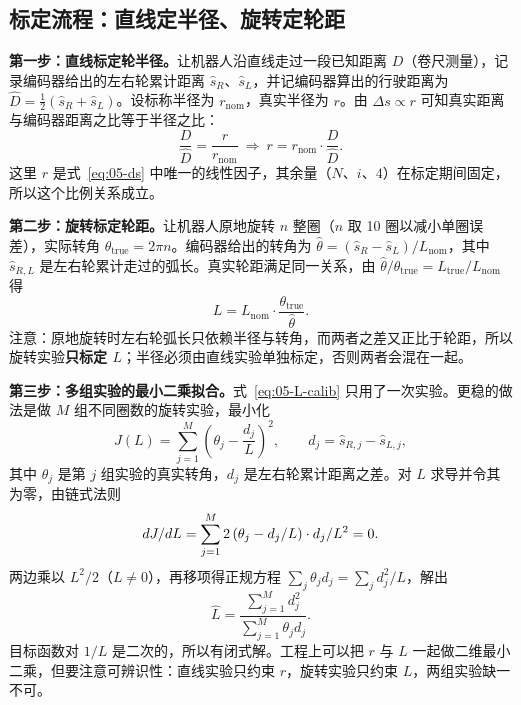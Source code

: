 \subsection{标定流程：直线定半径、旋转定轮距}

\textbf{第一步：直线标定轮半径。}让机器人沿直线走过一段已知距离 $D$（卷尺测量），记录编码器给出的左右轮累计距离 $\hat{s}_R$、$\hat{s}_L$，并记编码器算出的行驶距离为 $\hat{D}=\frac{1}{2}(\hat{s}_R+\hat{s}_L)$。设标称半径为 $r_{\text{nom}}$，真实半径为 $r$。由 $\Delta s\propto r$ 可知真实距离与编码器距离之比等于半径之比：
\begin{equation}
  \frac{D}{\hat{D}} = \frac{r}{r_{\text{nom}}}
  \ \Longrightarrow\
  r = r_{\text{nom}}\cdot\frac{D}{\hat{D}}.
  \label{eq:05-r-calib}
\end{equation}
这里 $r$ 是式~\eqref{eq:05-ds} 中唯一的线性因子，其余量（$N$、$i$、$4$）在标定期间固定，所以这个比例关系成立。

\textbf{第二步：旋转标定轮距。}让机器人原地旋转 $n$ 整圈（$n$ 取 10 圈以减小单圈误差），实际转角 $\theta_{\text{true}}=2\pi n$。编码器给出的转角为 $\hat{\theta}=(\hat{s}_R-\hat{s}_L)/L_{\text{nom}}$，其中 $\hat{s}_{R,L}$ 是左右轮累计走过的弧长。真实轮距满足同一关系，由 $\hat{\theta}/\theta_{\text{true}}=L_{\text{true}}/L_{\text{nom}}$ 得
\begin{equation}
  L = L_{\text{nom}}\cdot\frac{\theta_{\text{true}}}{\hat{\theta}}.
  \label{eq:05-L-calib}
\end{equation}
注意：原地旋转时左右轮弧长只依赖半径与转角，而两者之差又正比于轮距，所以旋转实验\textbf{只标定 $L$}；半径必须由直线实验单独标定，否则两者会混在一起。

\textbf{第三步：多组实验的最小二乘拟合。}式~\eqref{eq:05-L-calib} 只用了一次实验。更稳的做法是做 $M$ 组不同圈数的旋转实验，最小化
\begin{equation}
  J(L)=\sum_{j=1}^{M}\left(\theta_j-\frac{d_j}{L}\right)^{2},
  \qquad d_j=\hat{s}_{R,j}-\hat{s}_{L,j},
  \label{eq:05-ls-cost}
\end{equation}
其中 $\theta_j$ 是第 $j$ 组实验的真实转角，$d_j$ 是左右轮累计距离之差。对 $L$ 求导并令其为零，由链式法则
\begin{equation}
  d J/d L
  = \sum_{j=1}^{M}2\left(\theta_j-d_j/L\right)\cdot d_j/L^{2}=0.
\end{equation}
两边乘以 $L^{2}/2$（$L\ne0$），再移项得正规方程 $\sum_j\theta_j d_j=\sum_j d_j^{2}/L$，解出
\begin{equation}
  \hat{L} = \frac{\sum_{j=1}^{M}d_j^{2}}{\sum_{j=1}^{M}\theta_j d_j}.
  \label{eq:05-ls-solution}
\end{equation}
目标函数对 $1/L$ 是二次的，所以有闭式解。工程上可以把 $r$ 与 $L$ 一起做二维最小二乘，但要注意可辨识性：直线实验只约束 $r$，旋转实验只约束 $L$，两组实验缺一不可。

